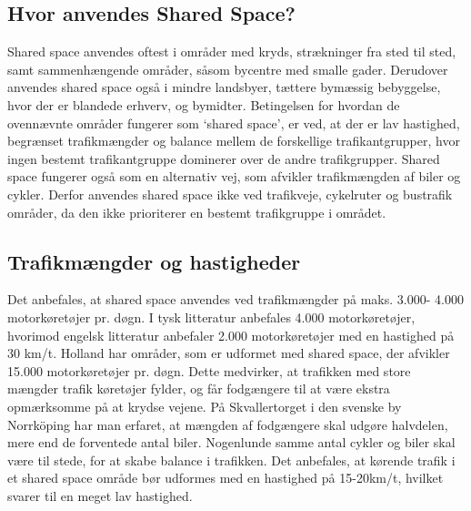 \subsection{Hvor anvendes Shared Space?}
\label{sub:hvor_anvendes_share_space}
Shared space anvendes oftest i områder med kryds, strækninger fra sted til sted, samt sammenhængende områder, såsom bycentre med smalle gader. Derudover anvendes shared space også i mindre landsbyer, tættere bymæssig bebyggelse, hvor der er blandede erhverv, og bymidter. Betingelsen for hvordan de ovennævnte områder fungerer som ‘shared space’, er ved, at der er lav hastighed, begrænset trafikmængder og balance mellem de forskellige trafikantgrupper, hvor ingen bestemt trafikantgruppe dominerer over de andre trafikgrupper. Shared space fungerer også som en alternativ vej, som afvikler trafikmængden af biler og cykler. Derfor anvendes shared space ikke ved trafikveje, cykelruter og bustrafik områder, da den ikke prioriterer en bestemt trafikgruppe i området. %
\subsection{Trafikmængder og hastigheder}
\label{sub:Trafikmaengder_og_hastgheder}
Det anbefales, at shared space anvendes ved trafikmængder på maks. 3.000- 4.000 motorkøretøjer pr. døgn. I tysk litteratur anbefales 4.000 motorkøretøjer, hvorimod engelsk litteratur anbefaler 2.000 motorkøretøjer med en hastighed på 30 km/t. Holland har områder, som er udformet med shared space, der afvikler 15.000 motorkøretøjer pr. døgn. Dette medvirker, at trafikken med store mængder trafik køretøjer fylder, og får fodgængere til at være ekstra opmærksomme på at krydse vejene. På Skvallertorget i den svenske by Norrköping har man erfaret, at mængden af fodgængere skal udgøre halvdelen, mere end de forventede antal biler. Nogenlunde samme antal cykler og biler skal være til stede, for at skabe balance i trafikken. Det anbefales, at kørende trafik i et shared space område bør udformes med en hastighed på 15-20km/t, hvilket svarer til en meget lav hastighed. %
